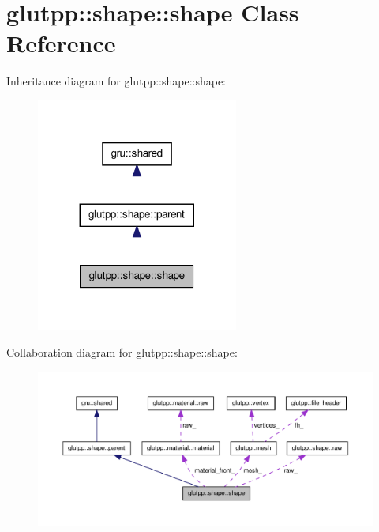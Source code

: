 \hypertarget{classglutpp_1_1shape_1_1shape}{\section{glutpp\-:\-:shape\-:\-:shape \-Class \-Reference}
\label{classglutpp_1_1shape_1_1shape}
}


\-Inheritance diagram for glutpp\-:\-:shape\-:\-:shape\-:
\nopagebreak
\begin{figure}[H]
\begin{center}
\leavevmode
\includegraphics[width=188pt]{classglutpp_1_1shape_1_1shape__inherit__graph}
\end{center}
\end{figure}


\-Collaboration diagram for glutpp\-:\-:shape\-:\-:shape\-:
\nopagebreak
\begin{figure}[H]
\begin{center}
\leavevmode
\includegraphics[width=350pt]{classglutpp_1_1shape_1_1shape__coll__graph}
\end{center}
\end{figure}
